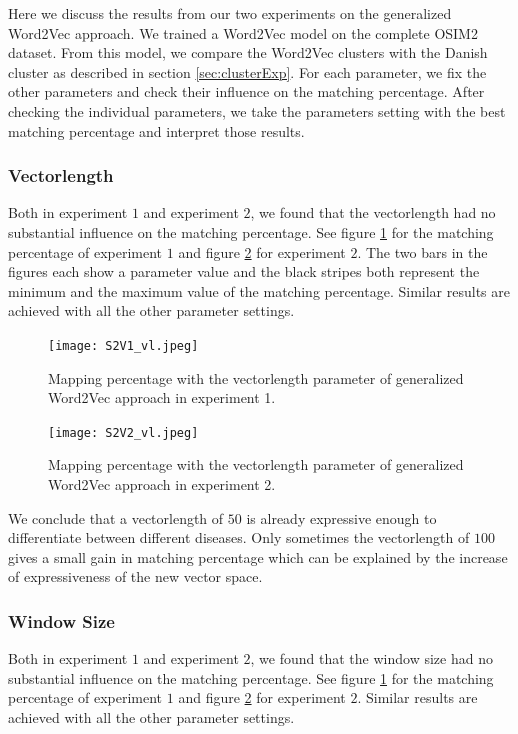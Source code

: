 Here we discuss the results from our two experiments on the generalized Word2Vec approach. We trained a Word2Vec model on the complete OSIM2 dataset. From this model, we compare the Word2Vec clusters with the Danish cluster as described in section \ref{sec:clusterExp}. For each parameter, we fix the other parameters and check their influence on the matching percentage. After checking the individual parameters, we take the parameters setting with the best matching percentage and interpret those results.

\subsubsection*{Vectorlength}

Both in experiment $1$ and experiment $2$, we found that the vectorlength had no substantial influence on the matching percentage. See figure \ref{fig:s2v_vl_1} for the matching percentage of experiment $1$ and figure \ref{fig:s2v_vl_2} for experiment $2$. The two bars in the figures each show a parameter value and the black stripes both represent the minimum and the maximum value of the matching percentage. Similar results are achieved with all the other parameter settings. \\

\begin{figure}[!htb]
	\centering
	\texttt{[image: S2V1\_vl.jpeg]}
	\caption{Mapping percentage with the vectorlength parameter of generalized Word2Vec approach in experiment 1.}
	\label{fig:s2v_vl_1}
\end{figure}

\begin{figure}[!htb]
	\centering
	\texttt{[image: S2V2\_vl.jpeg]}
	\caption{Mapping percentage with the vectorlength parameter of generalized Word2Vec approach in experiment 2.}
	\label{fig:s2v_vl_2}
\end{figure}

We conclude that a vectorlength of $50$ is already expressive enough to differentiate between different diseases. Only sometimes the vectorlength of $100$ gives a small gain in matching percentage which can be explained by the increase of expressiveness of the new vector space.

\subsubsection*{Window Size}

Both in experiment $1$ and experiment $2$, we found that the window size had no substantial influence on the matching percentage. See figure \ref{fig:s2v_vl_1} for the matching percentage of experiment $1$ and figure \ref{fig:s2v_vl_2} for experiment $2$. Similar results are achieved with all the other parameter settings. \\


